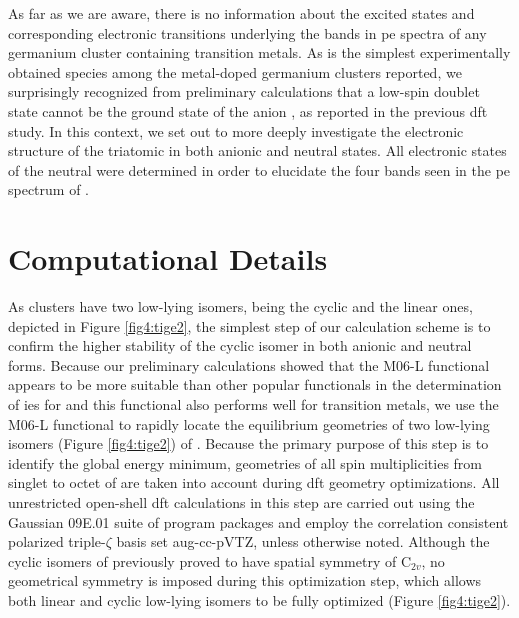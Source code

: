 \begin{refsection}
As far as we are aware, there is no information about the excited states and corresponding electronic transitions underlying the bands in \acrshort{pe} spectra of any germanium cluster containing transition metals. As  is the simplest experimentally obtained species among the metal-doped germanium clusters reported, we surprisingly recognized from preliminary calculations that a low-spin doublet state cannot be the ground state of the anion , as reported in the previous \acrshort{dft} study. In this context, we set out to more deeply investigate the electronic structure of the triatomic  in both anionic and neutral states. All electronic states of the neutral  were determined in order to elucidate the four bands seen in the \acrshort{pe} spectrum of . 




\section{Computational Details}


As  clusters have two low-lying isomers, being the cyclic and the linear ones, depicted in Figure \ref{fig4:tige2}, the simplest step of our calculation scheme is to confirm the higher stability of the cyclic isomer in both anionic and neutral forms. \cite{c4:22, c4:24} Because our preliminary calculations showed that the M06-L functional appears to be more suitable than other popular functionals in the determination of \acrshort{ie}s for  and this functional also performs well for transition metals, \cite{c4:25, c4:26} we use the M06-L functional\cite{c4:26} to rapidly locate the equilibrium geometries of two low-lying isomers (Figure \ref{fig4:tige2}) of . Because the primary purpose of this step is to identify the global energy minimum, geometries of all spin multiplicities from singlet to octet of  are taken into account during \acrshort{dft} geometry optimizations. All unrestricted open-shell \acrshort{dft} calculations in this step are carried out using the Gaussian 09E.01 suite of program packages \cite{c4:27} and employ the correlation consistent polarized triple-$\zeta$ basis set aug-cc-pVTZ,\cite{c4:28, c4:29} unless otherwise noted. Although the cyclic isomers of  previously proved to have spatial symmetry of C$_{2v}$, \cite{c4:22} no geometrical symmetry is imposed during this optimization step, which allows both linear and cyclic low-lying isomers to be fully optimized (Figure \ref{fig4:tige2}). 




\end{refsection}
